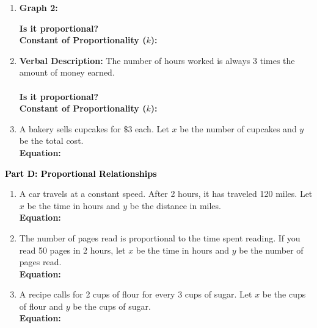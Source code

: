\documentclass[12pt, letterpaper, fleqn]{article}
\newcommand{\blank}{\underline{\hspace{2.2cm}}}
\newcommand{\blanklong}{\underline{\hspace{6.5cm}}}
\begin{document}
\begin{enumerate}[itemsep=5.5cm, leftmargin=0.6cm, resume]
\item \textbf{Graph 2:}
\begin{center}
\end{center}
\newline
\textbf{Is it proportional?} \blank
\newline \\
\textbf{Constant of Proportionality ($k$):} \blank
\item \textbf{Verbal Description:} The number of hours worked is always 3 times the amount of money earned.
\newline  \\ \\
\textbf{Is it proportional?} \blank
\newline \\
\textbf{Constant of Proportionality ($k$):} \blank
\item A bakery sells cupcakes for $\$3$ each. Let $x$ be the number of cupcakes and $y$ be the total cost.
\newline \\
\textbf{Equation:} \blanklong
\end{enumerate}

\newpage

\begin{tcolorbox}[colback=customteal!20]
\large\textcolor{black}{\textbf{Part D: Proportional Relationships}}
\end{tcolorbox}

\vspace{3mm}

\begin{enumerate}[itemsep=5.5cm, leftmargin=0.6cm, resume]
\item A car travels at a constant speed. After 2 hours, it has traveled 120 miles. Let $x$ be the time in hours and $y$ be the distance in miles.
\newline\\
\textbf{Equation:} \blanklong
\item The number of pages read is proportional to the time spent reading. If you read 50 pages in 2 hours, let $x$ be the time in hours and $y$ be the number of pages read.
\newline\\
\textbf{Equation:} \blanklong
\item A recipe calls for 2 cups of flour for every 3 cups of sugar. Let $x$ be the cups of flour and $y$ be the cups of sugar.
\newline\\
\textbf{Equation:} \blanklong
\end{enumerate}
\end{document}
